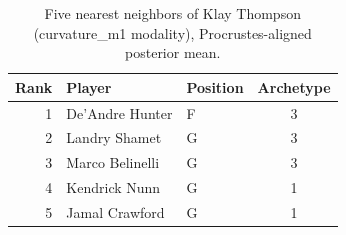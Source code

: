 \begin{table}[htbp]
  \centering\small
  \begin{tabular}{rllc}
    \toprule
    Rank & Player & Position & Archetype \\
    \midrule
    1 & De'Andre Hunter & F & 3 \\
    2 & Landry Shamet & G & 3 \\
    3 & Marco Belinelli & G & 3 \\
    4 & Kendrick Nunn & G & 1 \\
    5 & Jamal Crawford & G & 1 \\
    \bottomrule
  \end{tabular}
  \caption{Five nearest neighbors of Klay Thompson (curvature_m1 modality), Procrustes-aligned posterior mean.}
  \label{tab:Klay_Thompson_neighbors_curvature_m1}
\end{table}

